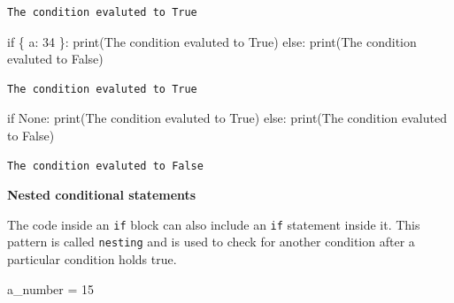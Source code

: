 \documentclass[
  letterpaper,
  DIV=11,
  numbers=noendperiod]{scrreprt}
\newenvironment{Shaded}{\begin{snugshade}}{\end{snugshade}}
\newcommand{\BuiltInTok}[1]{\textcolor[rgb]{0.00,0.23,0.31}{#1}}
\newcommand{\ControlFlowTok}[1]{\textcolor[rgb]{0.00,0.23,0.31}{#1}}
\newcommand{\DecValTok}[1]{\textcolor[rgb]{0.68,0.00,0.00}{#1}}
\newcommand{\NormalTok}[1]{\textcolor[rgb]{0.00,0.23,0.31}{#1}}
\newcommand{\OperatorTok}[1]{\textcolor[rgb]{0.37,0.37,0.37}{#1}}
\newcommand{\StringTok}[1]{\textcolor[rgb]{0.13,0.47,0.30}{#1}}
\newcommand{\VariableTok}[1]{\textcolor[rgb]{0.07,0.07,0.07}{#1}}
\begin{document}
\begin{verbatim}
The condition evaluted to True
\end{verbatim}

\begin{Shaded}
\begin{Highlighting}[]
\ControlFlowTok{if}\NormalTok{ \{ }\StringTok{\textquotesingle{}a\textquotesingle{}}\NormalTok{: }\DecValTok{34}\NormalTok{ \}:}
    \BuiltInTok{print}\NormalTok{(}\StringTok{\textquotesingle{}The condition evaluted to True\textquotesingle{}}\NormalTok{)}
\ControlFlowTok{else}\NormalTok{:}
    \BuiltInTok{print}\NormalTok{(}\StringTok{\textquotesingle{}The condition evaluted to False\textquotesingle{}}\NormalTok{)}
\end{Highlighting}
\end{Shaded}

\begin{verbatim}
The condition evaluted to True
\end{verbatim}

\begin{Shaded}
\begin{Highlighting}[]
\ControlFlowTok{if} \VariableTok{None}\NormalTok{:}
    \BuiltInTok{print}\NormalTok{(}\StringTok{\textquotesingle{}The condition evaluted to True\textquotesingle{}}\NormalTok{)}
\ControlFlowTok{else}\NormalTok{:}
    \BuiltInTok{print}\NormalTok{(}\StringTok{\textquotesingle{}The condition evaluted to False\textquotesingle{}}\NormalTok{)}
\end{Highlighting}
\end{Shaded}

\begin{verbatim}
The condition evaluted to False
\end{verbatim}

\textbf{Nested conditional statements}

The code inside an \texttt{if} block can also include an \texttt{if}
statement inside it. This pattern is called \texttt{nesting} and is used
to check for another condition after a particular condition holds true.

\begin{Shaded}
\begin{Highlighting}[]
\NormalTok{a\_number }\OperatorTok{=} \DecValTok{15}
\end{Highlighting}
\end{Shaded}
\end{document}
